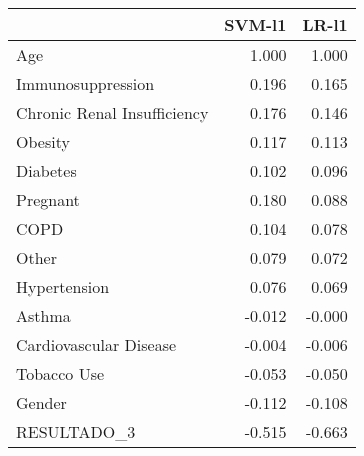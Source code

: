 \begin{tabular}{lrr}
\toprule
{} &  SVM-l1 &  LR-l1 \\
\midrule
Age                         &   1.000 &  1.000 \\
Immunosuppression           &   0.196 &  0.165 \\
Chronic Renal Insufficiency &   0.176 &  0.146 \\
Obesity                     &   0.117 &  0.113 \\
Diabetes                    &   0.102 &  0.096 \\
Pregnant                    &   0.180 &  0.088 \\
COPD                        &   0.104 &  0.078 \\
Other                       &   0.079 &  0.072 \\
Hypertension                &   0.076 &  0.069 \\
Asthma                      &  -0.012 & -0.000 \\
Cardiovascular Disease      &  -0.004 & -0.006 \\
Tobacco Use                 &  -0.053 & -0.050 \\
Gender                      &  -0.112 & -0.108 \\
RESULTADO\_3                 &  -0.515 & -0.663 \\
\bottomrule
\end{tabular}
